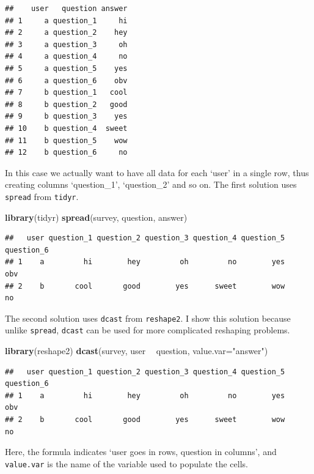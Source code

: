\documentclass[]{book}
\newenvironment{Shaded}{\begin{snugshade}}{\end{snugshade}}
\newcommand{\DataTypeTok}[1]{\textcolor[rgb]{0.13,0.29,0.53}{#1}}
\newcommand{\KeywordTok}[1]{\textcolor[rgb]{0.13,0.29,0.53}{\textbf{#1}}}
\newcommand{\NormalTok}[1]{#1}
\newcommand{\OperatorTok}[1]{\textcolor[rgb]{0.81,0.36,0.00}{\textbf{#1}}}
\newcommand{\StringTok}[1]{\textcolor[rgb]{0.31,0.60,0.02}{#1}}
\begin{document}
\begin{verbatim}
##    user   question answer
## 1     a question_1     hi
## 2     a question_2    hey
## 3     a question_3     oh
## 4     a question_4     no
## 5     a question_5    yes
## 6     a question_6    obv
## 7     b question_1   cool
## 8     b question_2   good
## 9     b question_3    yes
## 10    b question_4  sweet
## 11    b question_5    wow
## 12    b question_6     no
\end{verbatim}

In this case we actually want to have all data for each `user' in a single row, thus creating columns `question\_1', `question\_2' and so on. The first solution uses \texttt{spread} from \texttt{tidyr}.

\begin{Shaded}
\begin{Highlighting}[]
\KeywordTok{library}\NormalTok{(tidyr)}
\KeywordTok{spread}\NormalTok{(survey, question, answer)}
\end{Highlighting}
\end{Shaded}

\begin{verbatim}
##   user question_1 question_2 question_3 question_4 question_5 question_6
## 1    a         hi        hey         oh         no        yes        obv
## 2    b       cool       good        yes      sweet        wow         no
\end{verbatim}

The second solution uses \texttt{dcast} from \texttt{reshape2}. I show this solution because unlike \texttt{spread}, \texttt{dcast} can be used for more complicated reshaping problems.

\begin{Shaded}
\begin{Highlighting}[]
\KeywordTok{library}\NormalTok{(reshape2)}
\KeywordTok{dcast}\NormalTok{(survey, user }\OperatorTok{~}\StringTok{ }\NormalTok{question, }\DataTypeTok{value.var=}\StringTok{"answer"}\NormalTok{)}
\end{Highlighting}
\end{Shaded}

\begin{verbatim}
##   user question_1 question_2 question_3 question_4 question_5 question_6
## 1    a         hi        hey         oh         no        yes        obv
## 2    b       cool       good        yes      sweet        wow         no
\end{verbatim}

Here, the formula indicates `user goes in rows, question in columns', and \texttt{value.var} is the name of the variable used to populate the cells.
\end{document}
